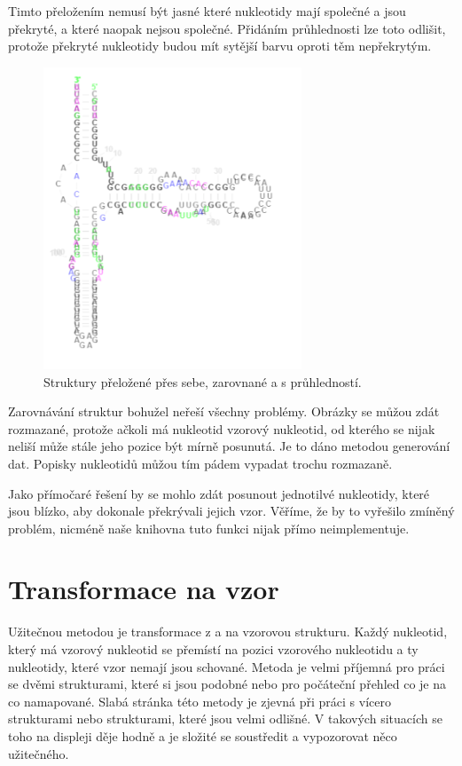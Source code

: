 Timto přeložením nemusí být jasné které nukleotidy mají společné a jsou
překryté, a které naopak nejsou společné. Přidáním průhlednosti lze toto
odlišit, protože překryté nukleotidy budou mít sytější barvu oproti těm
nepřekrytým. 

\begin{figure}[H]
  \centering
  \includegraphics[height=90mm]{../img/kap02/align/aligned.png}
  \caption{Struktury přeložené přes sebe, zarovnané a s průhledností.}
\end{figure}

Zarovnávání struktur bohužel neřeší všechny problémy. Obrázky se můžou zdát
rozmazané, protože ačkoli má nukleotid vzorový nukleotid, od kterého se nijak
neliší může stále jeho pozice být mírně posunutá. Je to dáno metodou generování
dat. Popisky nukleotidů můžou tím pádem vypadat trochu rozmazaně. 

Jako přímočaré řešení by se mohlo zdát posunout jednotilvé nukleotidy, které
jsou blízko, aby dokonale překrývali jejich vzor. Věříme, že by to vyřešilo
zmíněný problém, nicméně naše knihovna tuto funkci nijak přímo neimplementuje.

\section{Transformace na vzor}

Užitečnou metodou je transformace z a na vzorovou strukturu. Každý nukleotid,
který má vzorový nukleotid se přemístí na pozici vzorového nukleotidu a ty
nukleotidy, které vzor nemají jsou schované. Metoda je velmi příjemná pro práci
se dvěmi strukturami, které si jsou podobné nebo pro počáteční přehled co je na
co namapované. Slabá stránka této metody je zjevná při práci s vícero
strukturami nebo strukturami, které jsou velmi odlišné. V takových situacích se
toho na displeji děje hodně a je složité se soustředit a vypozorovat něco
užitečného.

